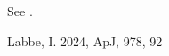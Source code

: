 \documentclass{aastex701}
\begin{document}
See \citet{L24}.
\begin{thebibliography}{}
 Labbe, I. 2024,  ApJ, 978, 92
\end{thebibliography}
\end{document}
